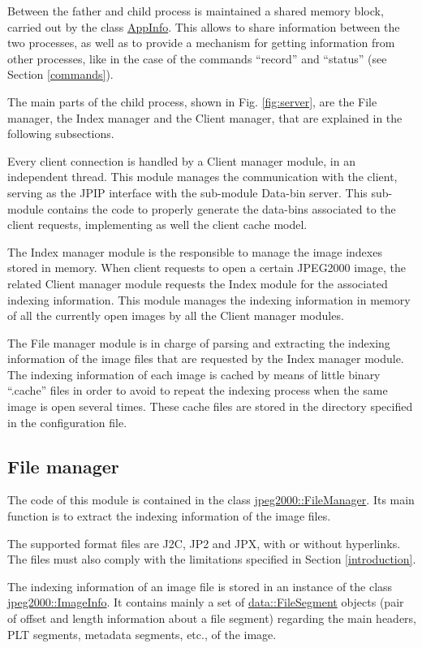 Between the father and child process is maintained a shared memory
block, carried out by the class \hyperlink{classAppInfo}{AppInfo}. This
allows to share information between the two processes, as well as to
provide a mechanism for getting information from other processes, like
in the case of the commands ``record'' and ``status'' (see Section
\ref{commands}).
 
The main parts of the child process, shown in Fig. \ref{fig:server}, are
the File manager, the Index manager and the Client manager, that
are explained in the following subsections.

Every client connection is handled by a Client manager module, in an
independent thread. This module manages the communication with the
client, serving as the JPIP interface with the sub-module Data-bin server. 
This sub-module contains the code to properly generate the data-bins
associated to the client requests, implementing as well the client
cache model.

The Index manager module is the responsible to manage the image indexes stored
in memory. When client requests to open a certain JPEG2000 image, the related
Client manager module requests the Index module for the associated 
indexing information. This module manages the indexing information in memory
of all the currently open images by all the Client manager modules.

The File manager module is in charge of parsing and extracting the indexing
information of the image files that are requested by the Index manager module.
The indexing information of each image is cached by means of little binary
``.cache'' files in order to avoid to repeat the indexing process when the
same image is open several times. These cache files are stored in the directory
specified in the configuration file.

\subsection{File manager}

The code of this module is contained in the class 
\hyperlink{classjpeg2000_1_1FileManager}{jpeg2000::FileManager}. Its main
function is to extract the indexing information of the image files.

The supported format files are J2C, JP2 and JPX, with or without 
hyperlinks. The files must also comply with the limitations specified 
in Section \ref{introduction}.

The indexing information of an image file is stored in an
instance of the class \hyperlink{classjpeg2000_1_1ImageInfo}
{jpeg2000::ImageInfo}. It
contains mainly a set of \hyperlink{classdata_1_1FileSegment}
{data::FileSegment} objects (pair of offset and length information
about a file segment) regarding the main headers, PLT segments,
metadata segments, etc., of the image.

